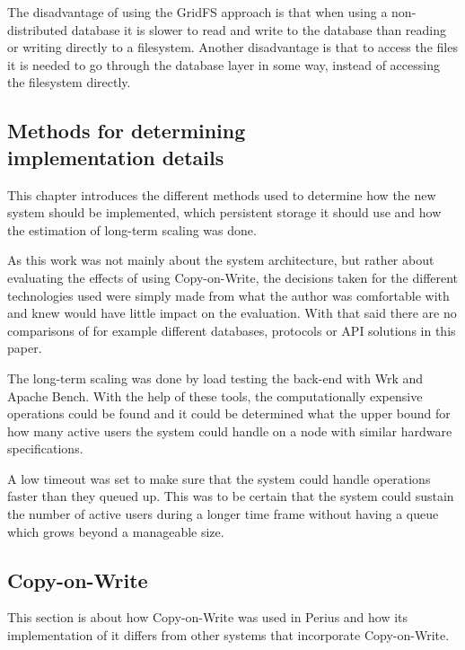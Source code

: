 \documentclass[a4paper,12pt]{article}
\begin{document}
\begin{description}
\par The disadvantage of using the GridFS approach is that when using a non-distributed database 
it is slower to read and write to the database than reading or writing directly to a filesystem. 
Another disadvantage is that to access the files it is needed to go through the database layer 
in some way, instead of accessing the filesystem directly.


\end{description}
\subsection{Methods for determining\\implementation details}
This chapter introduces the different methods used to determine how the new system should be
implemented, which persistent storage it should use and how the estimation of long-term scaling 
was done.
\\
\par As this work was not mainly about the system architecture, but rather about evaluating the
effects of using Copy-on-Write, the decisions taken for the different technologies used were simply
made from what the author was comfortable with and knew would have little impact on the evaluation. 
With that said there are no comparisons of for example different databases, protocols or API
solutions in this paper.

\par The long-term scaling was done by load testing the back-end with Wrk and Apache Bench. With
the help of these tools, the computationally expensive operations could be found and it could be
determined what the upper bound for how many active users the system could handle on a node with
similar hardware specifications.

\par A low timeout was set to make sure that the system could handle operations faster than they
queued up. This was to be certain that the system could sustain the number of active users during a
longer time frame without having a queue which grows beyond a manageable size.

\subsection{Copy-on-Write} \label{sec:copy-on-write}
This section is about how Copy-on-Write was used in Perius and how its implementation of it differs
from other systems that incorporate Copy-on-Write.
\end{document}
